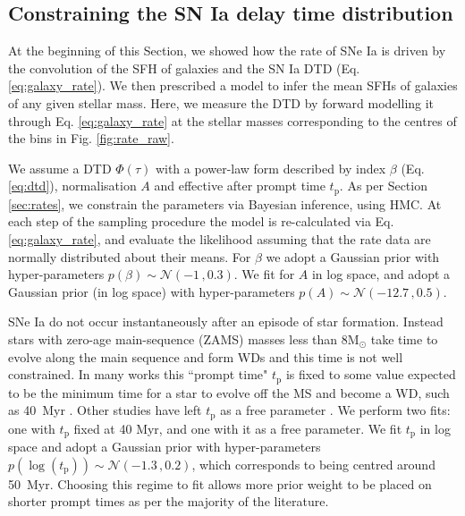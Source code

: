\documentclass[fleqn,usenatbib]{mnras}
\begin{document}
\subsection{Constraining the SN Ia delay time distribution}
\label{subsec:results_dtd}

At the beginning of this Section, we showed how the rate of SNe Ia is driven by the convolution of the SFH of galaxies and the SN Ia DTD (Eq. \ref{eq:galaxy_rate}). We then prescribed a model to infer the mean SFHs of galaxies of any given stellar mass. Here, we measure the DTD by forward modelling it through Eq. \ref{eq:galaxy_rate} at the stellar masses corresponding to the centres of the bins in Fig. \ref{fig:rate_raw}. 

We assume a DTD $\Phi(\tau)$ with a power-law form described by index $\beta$ (Eq. \ref{eq:dtd}), normalisation $A$ and effective after prompt time $t_{\mathrm{p}}$. As per Section \ref{sec:rates}, we constrain the parameters via Bayesian inference, using HMC. At each step of the sampling procedure the model is re-calculated via Eq. \ref{eq:galaxy_rate}, and evaluate the likelihood assuming that the rate data are normally distributed about their means. For $\beta$ we adopt a Gaussian prior with hyper-parameters $p(\beta) \sim \mathcal{N}(-1\,,0.3)$. We fit for $A$ in log space, and adopt a Gaussian prior (in log space) with hyper-parameters $p(A) \sim \mathcal{N}(-12.7\,, 0.5)$.

SNe Ia do not occur instantaneously after an episode of star formation. Instead stars with zero-age main-sequence (ZAMS) masses less than $8 \mathrm{M}_{\odot}$ take time to evolve along the main sequence and form WDs and this time is not well constrained. In many works this ``prompt time" $t_{\mathrm{p}}$ is fixed to some value expected to be the minimum time for a star to evolve off the MS and become a WD, such as 40~Myr \citep{Maoz2012,Graur2014,Graur2018}. Other studies have left $t_{\mathrm{p}}$ as a free parameter \citep{Heringer2019,Castrillo2020}. We perform two fits: one with $t_{\mathrm{p}}$ fixed at 40 Myr, and one with it as a free parameter. We fit $t_{\mathrm{p}}$ in log space and adopt a Gaussian prior with hyper-parameters $p(\log(t_{\mathrm{p}})) \sim \mathcal{N}(-1.3\,,0.2)$, which corresponds to being centred around 50~Myr. Choosing this regime to fit allows more prior weight to be placed on shorter prompt times as per the majority of the literature. 
\end{document}
